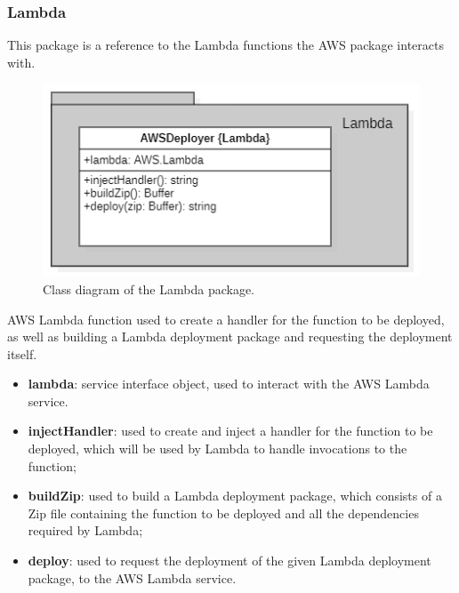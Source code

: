 	\subsubsection{Lambda}
	This package is a reference to the Lambda functions the AWS package interacts with.
	\begin{figure} [h!]
		\centering
		\includegraphics[width=0.7\linewidth]{diagrammi/etherless-server/Lambda}
		\caption{Class diagram of the Lambda package.}
	\end{figure}
	AWS Lambda function used to create a handler for the function to be deployed, as well as building a Lambda deployment package and requesting the deployment itself.
	\begin{itemize}
		\item \textbf{lambda}: service interface object, used to interact with the AWS Lambda service.
	\end{itemize}
	\begin{itemize}
		\item \textbf{injectHandler}: used to create and inject a handler for the function to be deployed, which will be used by Lambda to handle invocations to the function;
		\item \textbf{buildZip}: used to build a Lambda deployment package, which consists of a Zip file containing the function to be deployed and all the dependencies required by Lambda;
		\item \textbf{deploy}: used to request the deployment of the given Lambda deployment package, to the AWS Lambda service.
	\end{itemize}
